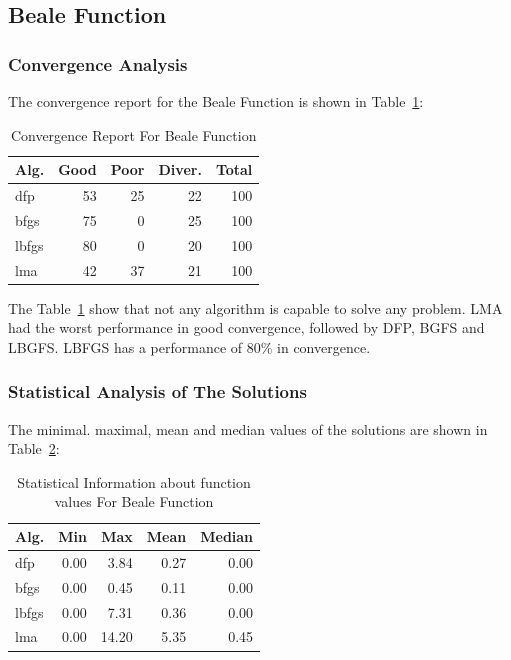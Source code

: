 \documentclass[conference]{IEEEtran}
\begin{document}
\subsection{Beale Function}
\label{beale2D}

\subsubsection{Convergence Analysis}
\label{convergencebeale2D}


The convergence report for the Beale Function is shown in Table~\ref{convergence:beale}:

\begin{table}[H]
\centering
\caption{Convergence Report For Beale Function}
\label{convergence:beale}
\begin{tabular}{lrrrr}
\toprule
 Alg. &  Good &  Poor &  Diver. &  Total \\
\midrule
  dfp &    53 &    25 &      22 &    100 \\
 bfgs &    75 &     0 &      25 &    100 \\
lbfgs &    80 &     0 &      20 &    100 \\
  lma &    42 &    37 &      21 &    100 \\
\bottomrule
\end{tabular}
\end{table}

The Table~\ref{convergence:beale} show that not any algorithm
is capable to solve any problem. LMA had the worst performance
in good convergence, followed by DFP, BGFS and LBGFS. LBFGS has
a performance of 80\% in convergence.


\subsubsection{Statistical Analysis of The Solutions}
\label{statisticalanalysisbeale2D}

The minimal. maximal, mean and median values of the solutions are shown in Table~\ref{function_values:beale}:

\begin{table}[H]
\centering
\caption{Statistical Information about function values For Beale Function}
\label{function_values:beale}
\begin{tabular}{lrrrr}
\toprule
 Alg. &  Min &   Max &  Mean &  Median \\
\midrule
  dfp & 0.00 &  3.84 &  0.27 &    0.00 \\
 bfgs & 0.00 &  0.45 &  0.11 &    0.00 \\
lbfgs & 0.00 &  7.31 &  0.36 &    0.00 \\
  lma & 0.00 & 14.20 &  5.35 &    0.45 \\
\bottomrule
\end{tabular}
\end{table}
\end{document}
